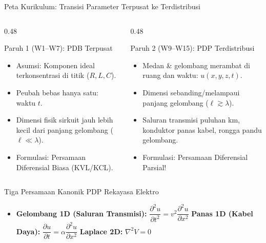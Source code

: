 \documentclass[aspectratio=169,10pt]{beamer}
\begin{document}
\begin{frame}{Peta Kurikulum: Transisi Parameter Terpusat ke Terdistribusi}
  \begin{columns}[t]
    \begin{column}{0.48\textwidth}
      \begin{block}{Paruh 1 (W1--W7): PDB Terpusat}
        \begin{itemize}
          \item Asumsi: Komponen ideal terkonsentrasi di titik ($R, L, C$).
          \item Peubah bebas hanya satu: waktu $t$.
          \item Dimensi fisik sirkuit jauh lebih kecil dari panjang gelombang ($\ell \ll \lambda$).
          \item Formulasi: Persamaan Diferensial Biasa (KVL/KCL).
        \end{itemize}
      \end{block}
    \end{column}
    \begin{column}{0.48\textwidth}
      \begin{alertblock}{Paruh 2 (W9--W15): PDP Terdistribusi}
        \begin{itemize}
          \item Medan \& gelombang merambat di ruang dan waktu: $u(x,y,z,t)$.
          \item Dimensi sebanding/melampaui panjang gelombang ($\ell \gtrsim \lambda$).
          \item Saluran transmisi puluhan km, konduktor panas kabel, rongga pandu gelombang.
          \item Formulasi: Persamaan Diferensial Parsial!
        \end{itemize}
      \end{alertblock}
    \end{column}
  \end{columns}
  \vspace{0.2cm}
  \begin{exampleblock}{Tiga Persamaan Kanonik PDP Rekayasa Elektro}
    \begin{itemize}
      \item \textbf{Gelombang 1D (Saluran Transmisi):} $\dfrac{\partial^2 u}{\partial t^2} = v^2 \dfrac{\partial^2 u}{\partial x^2}$ \quad \textbf{Panas 1D (Kabel Daya):} $\dfrac{\partial u}{\partial t} = \alpha \dfrac{\partial^2 u}{\partial x^2}$ \quad \textbf{Laplace 2D:} $\nabla^2 V = 0$
    \end{itemize}
  \end{exampleblock}
\end{frame}
\end{document}

